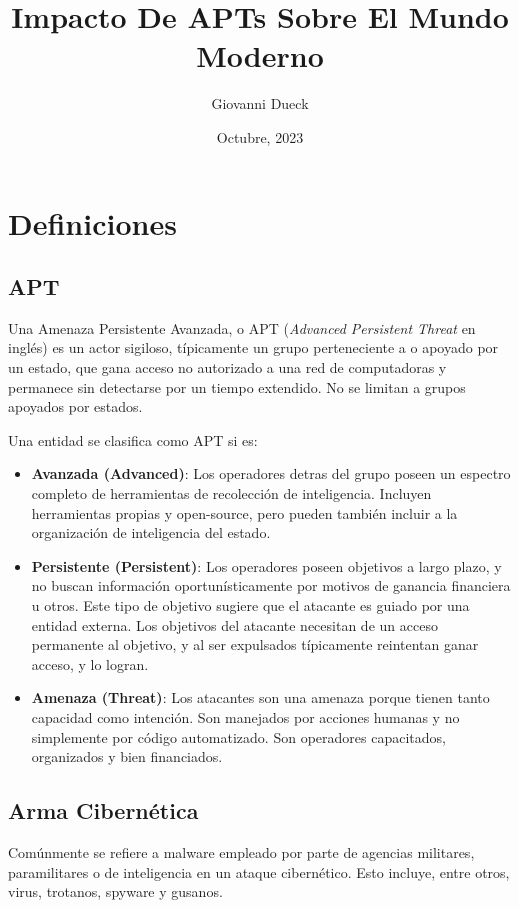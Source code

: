 \documentclass{article}
\title{Impacto De APTs Sobre El Mundo Moderno}
\author{Giovanni Dueck}
\date{Octubre, 2023}
\begin{document}
\maketitle


\section{Definiciones}
\subsection{APT}
Una Amenaza Persistente Avanzada, o APT ({\it Advanced Persistent Threat} en inglés) es un actor sigiloso, típicamente un grupo perteneciente a o apoyado por un estado, que gana acceso no autorizado a una red de computadoras y permanece sin detectarse por un tiempo extendido. No se limitan a grupos apoyados por estados. \autocite{cybereason-apt} 

Una entidad se clasifica como APT si es:
\begin{itemize}
    \item {\bf Avanzada (Advanced)}: Los operadores detras del grupo poseen un espectro completo de herramientas de recolección de inteligencia. Incluyen herramientas propias y open-source, pero pueden también incluir a la organización de inteligencia del estado.
    \item {\bf Persistente (Persistent)}: Los operadores poseen objetivos a largo plazo, y no buscan información oportunísticamente por motivos de ganancia financiera u otros. Este tipo de objetivo sugiere que el atacante es guiado por una entidad externa. Los objetivos del atacante necesitan de un acceso permanente al objetivo, y al ser expulsados típicamente reintentan ganar acceso, y lo logran.
    \item {\bf Amenaza (Threat)}: Los atacantes son una amenaza porque tienen tanto capacidad como intención. Son manejados por acciones humanas y no simplemente por código automatizado. Son operadores capacitados, organizados y bien financiados. \autocite{itgov-apt}
\end{itemize}

\subsection{Arma Cibernética}
Comúnmente se refiere a malware empleado por parte de agencias militares, paramilitares o de inteligencia en un ataque cibernético. Esto incluye, entre otros, virus, trotanos, spyware y gusanos.
\end{document}
